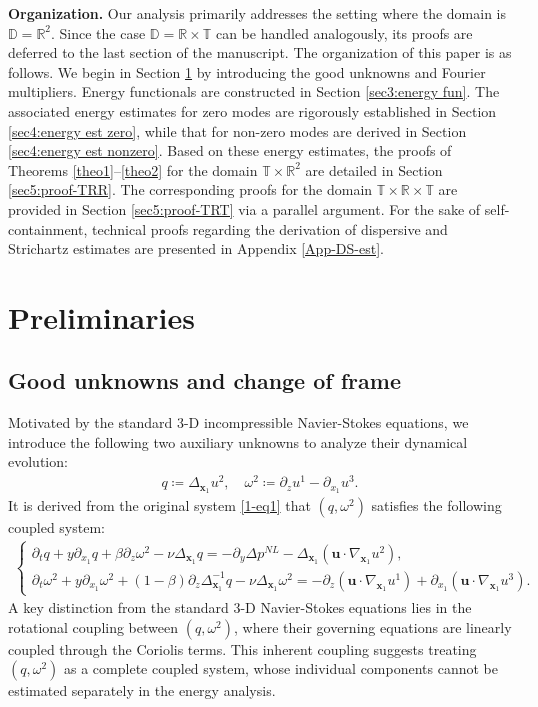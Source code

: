 \documentclass[11pt,reqno]{article}
\numberwithin{equation}{section}
\newcommand\R{{\mathbb R}}
\newcommand\T{{\mathbb T}}
\newcommand\DD{{\mathbb D}}
\newcommand\x{\bm{x}}
\newcommand\uu{\bm{u}}
\newcommand \tri {\coloneqq}
\let\pa=\partial
\let\na=\nabla
\let\om=\omega
\begin{document}
\noindent\textbf{Organization.}
Our analysis primarily addresses the setting where the domain is $\DD=\R^2$. Since the case $\DD=\R\times\T$ can be handled analogously, its proofs are deferred to the last section of the manuscript.
The organization of this paper is as follows. We begin in Section \ref{sec2:Pre} by introducing the good unknowns and Fourier multipliers. 
Energy functionals are constructed in Section \ref{sec3:energy fun}.  
The associated energy estimates for zero modes are rigorously established in Section \ref{sec4:energy est zero}, while that for non-zero modes are derived in Section \ref{sec4:energy est nonzero}. 
Based on these energy estimates, the proofs of Theorems \ref{theo1}--\ref{theo2} for the domain $\T\times\R^2$ are detailed in Section \ref{sec5:proof-TRR}. 
The corresponding proofs for the domain $\T\times\R\times\T$ are provided in Section \ref{sec5:proof-TRT} via a parallel argument. 
For the sake of self-containment, technical proofs regarding the derivation of dispersive and Strichartz estimates are presented in Appendix \ref{App-DS-est}.




\section{Preliminaries}
\label{sec2:Pre}
\subsection{Good unknowns and change of frame }


Motivated by the standard 3-D incompressible Navier-Stokes equations, we introduce the following two auxiliary unknowns  to analyze their dynamical evolution:
\begin{align}\label{def-q-om2}
q\tri \Delta_{\x_1} u^2,
\quad
\omega^2\tri \pa_{z} u^1-\pa_{x_1} u^3.
\end{align}
It is derived from the original system \eqref{1-eq1} that $(q,\omega^2)$ satisfies the following coupled system:
\begin{align}\label{3-eq1}
\left\{\begin{array}{l}
	\displaystyle
	\pa_t q +y\pa_{x_1} q+ \beta \pa_{z}\om^2-\nu \Delta_{\x_1}q=-\pa_{y}{\Delta} p^{NL}-\Delta_{\x_1}(\uu\cdot\na_{\x_1}u^2),
	\\[1ex]
	\displaystyle
	\pa_t \om^2 +y\pa_{x_1} \om^2+ (1-\beta)\pa_z\Delta_{\x_1}^{-1}q-\nu \Delta_{\x_1}\om^2=-\pa_{z}(\uu\cdot\na_{\x_1}u^1)+\pa_{x_1}(\uu\cdot\na_{\x_1}u^3).
\end{array}\right.
\end{align}
A key distinction from the standard 3-D Navier-Stokes equations lies in the rotational coupling between $(q,\om^2)$, where their governing equations are linearly coupled through the Coriolis terms. 
This inherent coupling suggests treating $(q,\om^2)$ as a complete coupled system, whose individual components cannot be estimated separately in the energy analysis.
\end{document}
